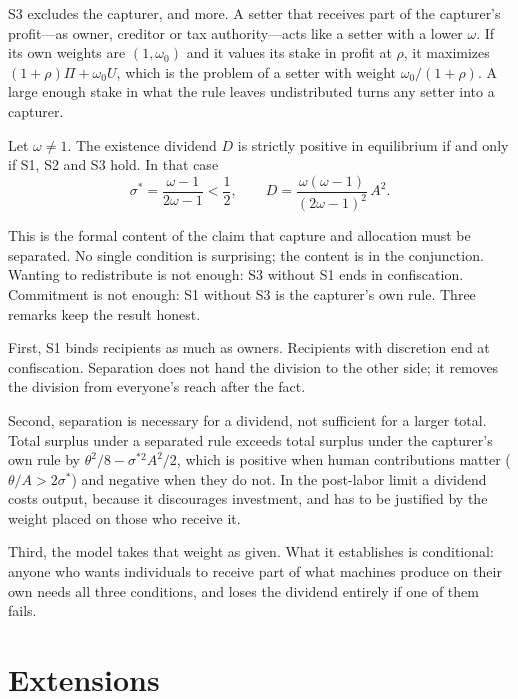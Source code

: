 S3 excludes the capturer, and more. A setter that receives part of the capturer's
profit---as owner, creditor or tax authority---acts like a setter with a lower $\omega$.
If its own weights are $(1,\omega_0)$ and it values its stake in profit at $\rho$, it
maximizes $(1+\rho)\Pi+\omega_0U$, which is the problem of a setter with weight
$\omega_0/(1+\rho)$. A large enough stake in what the rule leaves undistributed turns any
setter into a capturer.

\begin{proposition}[Separation]\label{prop:sep}
Let $\omega\neq 1$. The existence dividend $D$ is strictly positive in equilibrium if and
only if S1, S2 and S3 hold. In that case
\begin{equation}
  \sigma^*=\frac{\omega-1}{2\omega-1}<\frac12, \qquad
  D=\frac{\omega(\omega-1)}{(2\omega-1)^2}\,A^2 .
\end{equation}
\end{proposition}

This is the formal content of the claim that capture and allocation must be separated.
No single condition is surprising; the content is in the conjunction. Wanting to
redistribute is not enough: S3 without S1 ends in confiscation. Commitment is not enough:
S1 without S3 is the capturer's own rule. Three remarks keep the result honest.

First, S1 binds recipients as much as owners. Recipients with discretion end at
confiscation. Separation does not hand the division to the other side; it removes the
division from everyone's reach after the fact.

Second, separation is necessary for a dividend, not sufficient for a larger total. Total
surplus under a separated rule exceeds total surplus under the capturer's own rule by
$\theta^2/8-\sigma^{*2}A^2/2$, which is positive when human contributions matter
($\theta/A>2\sigma^*$) and negative when they do not. In the post-labor limit a dividend
costs output, because it discourages investment, and has to be justified by the weight
placed on those who receive it.

Third, the model takes that weight as given. What it establishes is conditional: anyone
who wants individuals to receive part of what machines produce on their own needs all
three conditions, and loses the dividend entirely if one of them fails.

\section{Extensions}\label{sec:ext}

